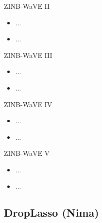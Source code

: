 \documentclass{beamer}
\begin{document}
\begin{frame}{ZINB-WaVE II}

\begin{itemize}
  \itemsep10pt
  \item ...
  \item ...
\end{itemize}

\end{frame}


\begin{frame}{ZINB-WaVE III}

\begin{itemize}
  \itemsep10pt
  \item ...
  \item ...
\end{itemize}

\end{frame}


\begin{frame}{ZINB-WaVE IV}

\begin{itemize}
  \itemsep10pt
  \item ...
  \item ...
\end{itemize}

\end{frame}


\begin{frame}{ZINB-WaVE V}

\begin{itemize}
  \itemsep10pt
  \item ...
  \item ...
\end{itemize}

\end{frame}

\subsection{DropLasso (Nima)}
\end{document}
